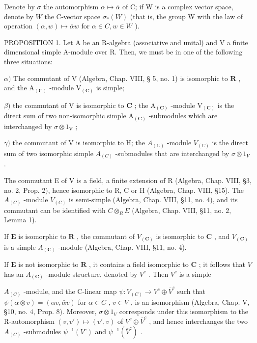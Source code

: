 
Denote by \(\sigma\) the automorphism \(\alpha\mapsto\bar{\alpha}\) of C; if W is a complex vector space, denote by \(\overline{W}\) the C-vector space \(\sigma_{*}(W)\) (that is, the group W with the law of operation \((\alpha,w)\mapsto\bar{\alpha}w\) for \(\alpha\in C, w\in W\) ).

PROPOSITION 1. Let A be an R-algebra (associative and unital) and V a finite dimensional simple A-module over R. Then, we must be in one of the following three situations:

\(\alpha)\) The commutant of V (Algebra, Chap. VIII, § 5, no. 1) is isomorphic to \(\mathbf{R}\) , and the \(\mathrm{A}_{(\mathbf{C})}\) -module \(\mathrm{V}_{(\mathbf{C})}\) is simple;

\(\beta)\) the commutant of V is isomorphic to \(\mathbf{C}\) ; the \(\mathrm{A}_{(\mathbf{C})}\) -module \(\mathrm{V}_{(\mathbf{C})}\) is the direct sum of two non-isomorphic simple \(\mathrm{A}_{(\mathbf{C})}\) -submodules which are interchanged by \(\sigma \otimes 1_{\mathrm{V}}\) ;

\(\gamma)\) the commutant of V is isomorphic to H; the \(A_{(C)}\) -module \(V_{(C)}\) is the direct sum of two isomorphic simple \(A_{(C)}\) -submodules that are interchanged by \(\sigma \otimes 1_V\) .

The commutant E of V is a field, a finite extension of R (Algebra, Chap. VIII, §3, no. 2, Prop. 2), hence isomorphic to R, C or H (Algebra, Chap. VIII, §15). The \(A_{(C)}\) -module \(V_{(C)}\) is semi-simple (Algebra, Chap. VIII, §11, no. 4), and its commutant can be identified with \(C \otimes_{R} E\) (Algebra, Chap. VIII, §11, no. 2, Lemma 1).

If \(\mathbf{E}\) is isomorphic to \(\mathbf{R}\) , the commutant of \(V_{(\mathbf{C})}\) is isomorphic to \(\mathbf{C}\) , and \(V_{(\mathbf{C})}\) is a simple \(A_{(\mathbf{C})}\) -module (Algebra, Chap. VIII, §11, no. 4).

If \(\mathbf{E}\) is not isomorphic to \(\mathbf{R}\) , it contains a field isomorphic to \(\mathbf{C}\) ; it follows that \(V\) has an \(A_{(\mathbf{C})}\) -module structure, denoted by \(V^c\) . Then \(V^c\) is a simple

\(A_{(C)}\) -module, and the C-linear map \(\psi: V_{(C)} \to V^{c} \oplus \overline{V}^{c}\) such that \(\psi(\alpha \otimes v) = (\alpha v, \bar{\alpha} v)\) for \(\alpha \in C\) , \(v \in V\) , is an isomorphism (Algebra, Chap. V, §10, no. 4, Prop. 8). Moreover, \(\sigma \otimes 1_{V}\) corresponds under this isomorphism to the R-automorphism \((v, v') \mapsto (v', v)\) of \(V^{c} \oplus \overline{V}^{c}\) , and hence interchanges the two \(A_{(C)}\) -submodules \(\psi^{-1}(V^{c})\) and \(\psi^{-1}(\overline{V}^{c})\) .

